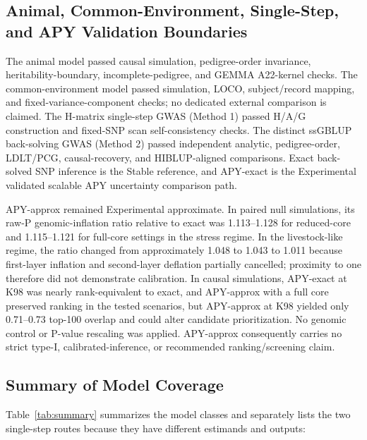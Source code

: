 \documentclass[11pt,a4paper]{article}
\begin{document}
\subsection{Animal, Common-Environment, Single-Step, and APY Validation Boundaries}
\label{sec:ssgwas_apy_results}

The animal model passed causal simulation, pedigree-order invariance, heritability-boundary, incomplete-pedigree, and GEMMA A22-kernel checks. The common-environment model passed simulation, LOCO, subject/record mapping, and fixed-variance-component checks; no dedicated external comparison is claimed. The H-matrix single-step GWAS (Method 1) passed H/A/G construction and fixed-SNP scan self-consistency checks. The distinct ssGBLUP back-solving GWAS (Method 2) passed independent analytic, pedigree-order, LDLT/PCG, causal-recovery, and HIBLUP-aligned comparisons. Exact back-solved SNP inference is the Stable reference, and APY-exact is the Experimental validated scalable APY uncertainty comparison path.

APY-approx remained Experimental approximate. In paired null simulations, its raw-P genomic-inflation ratio relative to exact was 1.113--1.128 for reduced-core and 1.115--1.121 for full-core settings in the stress regime. In the livestock-like regime, the ratio changed from approximately 1.048 to 1.043 to 1.011 because first-layer inflation and second-layer deflation partially cancelled; proximity to one therefore did not demonstrate calibration. In causal simulations, APY-exact at K98 was nearly rank-equivalent to exact, and APY-approx with a full core preserved ranking in the tested scenarios, but APY-approx at K98 yielded only 0.71--0.73 top-100 overlap and could alter candidate prioritization. No genomic control or P-value rescaling was applied. APY-approx consequently carries no strict type-I, calibrated-inference, or recommended ranking/screening claim.

\subsection{Summary of Model Coverage}
\label{sec:res_summary}

Table~\ref{tab:summary} summarizes the model classes and separately lists the two single-step routes because they have different estimands and outputs:
\end{document}
